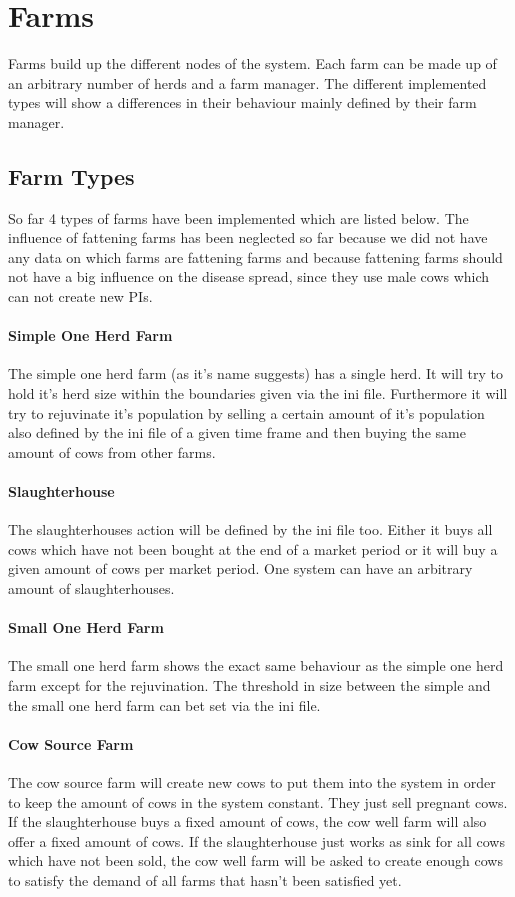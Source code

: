 \section{Farms}
Farms build up the different nodes of the system. Each farm can be made up of an arbitrary number of herds and a farm manager. The different implemented types will show a differences in their behaviour mainly defined by their farm manager.
\subsection{Farm Types}
So far 4 types of farms have been implemented which are listed below. The influence of fattening farms has been neglected so far because we did not have any data on which farms are fattening farms and because fattening farms should not have a big influence on the disease spread, since they use male cows which can not create new PIs.
\paragraph{Simple One Herd Farm}
The simple one herd farm (as it's name suggests) has a single herd. It will try to hold it's herd size within the boundaries given via the ini file. Furthermore it will try to rejuvinate it's population by selling a certain amount of it's population also defined by the ini file of a given time frame and then buying the same amount of cows from other farms. 
\paragraph{Slaughterhouse}
The slaughterhouses action will be defined by the ini file too. Either it buys all cows which have not been bought at the end of a market period or it will buy a given amount of cows per market period. One system can have an arbitrary amount of slaughterhouses.
\paragraph{Small One Herd Farm}
The small one herd farm shows the exact same behaviour as the simple one herd farm except for the rejuvination. The threshold in size between the simple and the small one herd farm can bet set via the ini file. 
\paragraph{Cow Source Farm}
The cow source farm will create new cows to put them into the system in order to keep the amount of cows in the system constant. They just sell pregnant cows. If the slaughterhouse buys a fixed amount of cows, the cow well farm will also offer a fixed amount of cows. If the slaughterhouse just works as sink for all cows which have not been sold, the cow well farm will be asked to create enough cows to satisfy the demand of all farms that hasn't been satisfied yet.
